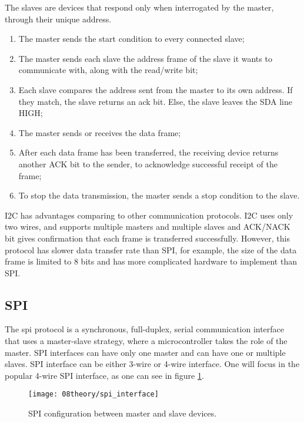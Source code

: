 
The slaves are devices that respond only when interrogated by the master, through their unique address.
\begin{enumerate}
	\item The master sends the start condition to every connected slave;
	\item The master sends each slave the address frame of the slave it wants to communicate with, along with the read/write bit;
	\item Each slave compares the address sent from the master to its own address. If they match, the slave returns an \ac{ack} bit. Else, the slave leaves the SDA line HIGH;
	\item The master sends or receives the data frame;
	\item After each data frame has been transferred, the receiving device returns another ACK bit to the sender, to acknowledge successful receipt of the frame;
	\item To stop the data transmission, the master sends a stop condition to the slave.
\end{enumerate}

I2C has advantages comparing to other communication protocols. I2C uses only two wires, and supports multiple masters and multiple slaves and ACK/NACK bit gives confirmation that each frame is transferred successfully. However, this protocol has slower data transfer rate than SPI, for example, the size of the data frame is limited to 8 bits and has more complicated hardware to implement than SPI.

\clearpage
\subsection{SPI}
The \ac{spi} protocol is a synchronous, full-duplex, serial communication interface that uses a master-slave strategy, where a microcontroller takes the role of the master. SPI interfaces can have only one master and can have one or multiple slaves. SPI interface can be either 3-wire or 4-wire interface. One will focus in the popular 4-wire SPI interface, as one can see in figure \ref{fig:spi_interface}. \cite{spi_interface}

\begin{figure}[H]
	\centering
	\texttt{[image: 08theory/spi\_interface]}
	\caption{SPI configuration between master and slave devices.}
	\label{fig:spi_interface}
\end{figure}


